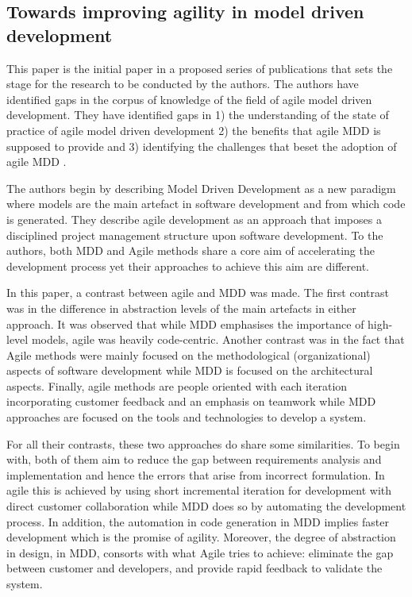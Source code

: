 \documentclass[10pt, a4paper, twocolumn]{article}
\begin{document}
\subsection{Towards improving agility in model driven development}

This paper is the initial paper in a proposed series of publications that sets the stage for the research to be conducted by the authors. The authors have identified gaps in the corpus of knowledge of the field of agile model driven development. They have identified gaps in 1) the understanding of the state of practice of agile model driven development 2) the benefits that agile MDD is supposed to provide and 3) identifying the challenges that beset the adoption of agile MDD \cite{alfraihi2016towards}.

The authors begin by describing Model Driven Development as a new paradigm where models are the main artefact in software development and from which code is generated. They describe agile development as an approach that imposes a disciplined project management structure upon software development. To the authors, both MDD and Agile methods share a core aim of accelerating the development process yet their approaches to achieve this aim are different.

In this paper, a contrast between agile and MDD was made. The first contrast was in the difference in abstraction levels of the main artefacts in either approach. It was observed that while MDD emphasises the importance of high-level models, agile was heavily code-centric. Another contrast was in the fact that Agile methods were mainly focused on the methodological (organizational) aspects of software development while MDD is focused on the architectural aspects. Finally, agile methods are people oriented with each iteration incorporating customer feedback and an emphasis on teamwork while MDD approaches are focused on the tools and technologies to develop a system.

For all their contrasts, these two approaches do share some similarities. To begin with, both of them aim to reduce the gap between requirements analysis and implementation and hence the errors that arise from incorrect formulation. In agile this is achieved by using short incremental iteration for development with direct customer collaboration while MDD does so by automating the development process. In addition, the automation in code generation in MDD implies faster development which is the promise of agility. Moreover, the degree of abstraction in design, in MDD, consorts with what Agile tries to achieve: eliminate the gap between customer and developers, and provide rapid feedback to validate the system.
\end{document}

